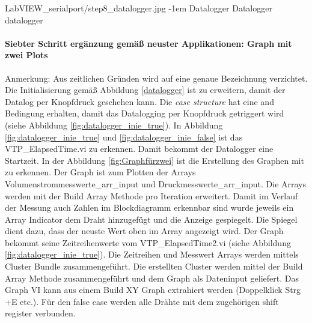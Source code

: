 {LabVIEW_serialport/step8_datalogger.jpg}
{-1em}
{Datalogger}
{Datalogger}
{datalogger}

\paragraph{Siebter Schritt ergänzung gemäß neuster Applikationen: Graph mit zwei Plots}


Anmerkung: Aus zeitlichen Gründen wird auf eine genaue Bezeichnung verzichtet. Die Initialisierung gemäß Abbildung \ref{datalogger} ist zu erweitern, damit der Datalog per Knopfdruck geschehen kann. Die \textit{case structure} hat eine {\Menlo and} Bedingung erhalten, damit das Datalogging per Knopfdruck getriggert wird (siehe Abbildung \ref{fig:datalogger_inie_true}). In Abbildung \ref{fig:datalogger_inie_true} und \ref{fig:datalogger_inie_false} ist das {\Menlo VTP\_ElapsedTime.vi} zu erkennen. Damit bekommt der Datalogger eine Startzeit. In der Abbildung \ref{fig:Graphfürzwei} ist die Erstellung des Graphen mit zu erkennen. Der Graph ist zum Plotten der Arrays {\Menlo Volumenstrommesswerte\_arr\_input} und {\Menlo Druckmesswerte\_arr\_input}. Die Arrays werden mit der Build Array Methode pro Iteration erweitert. Damit im Verlauf der Messung auch Zahlen im Blockdiagramm erkennbar sind wurde jeweils ein {\Menlo Array Indicator} dem Draht hinzugefügt und die Anzeige gespiegelt. Die Spiegel dient dazu, dass der neuste Wert oben im Array angezeigt wird. Der Graph bekommt seine Zeitreihenwerte vom {\Menlo VTP\_ElapsedTime2.vi} (siehe Abbildung \ref{fig:datalogger_inie_true}). Die Zeitreihen und Messwert Arrays werden mittels {\Menlo Cluster Bundle} zusammengeführt. Die erstellten {\Menlo Cluster} werden mittel der {\Menlo Build Array Methode} zusammengeführt und dem Graph als Dateninput geliefert. Das Graph VI kann aus einem Build XY Graph extrahiert werden (Doppelklick \> Strg +E etc.). Für den {\Menlo false case} werden alle Drähte mit dem zugehörigen {\Menlo shift register} verbunden.

